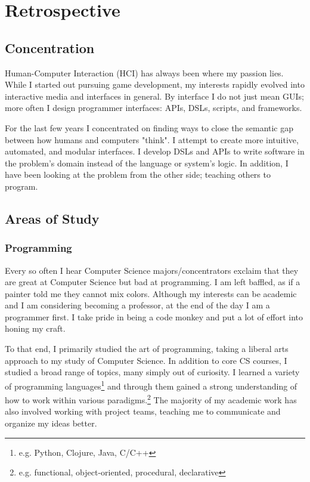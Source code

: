 \chapter{Retrospective}

\section*{Concentration}


Human-Computer Interaction (HCI) has always been where my passion lies.
While I started out pursuing game development, my interests rapidly
evolved into interactive media and interfaces in general. By interface I
do not just mean GUIs; more often I design programmer interfaces: APIs,
DSLs, scripts, and frameworks.

For the last few years I concentrated on finding ways to close the
semantic gap between how humans and computers "think". I attempt
to create more intuitive, automated, and modular interfaces. I develop
DSLs and APIs to write software in the problem's domain instead of the
language or system's logic. In addition, I have been looking at the
problem from the other side; teaching others to program.


\section*{Areas of Study}
\subsection*{Programming}

Every so often I hear Computer Science majors/concentrators exclaim that
they are great at Computer Science but bad at programming. I am left
baffled, as if a painter told me they cannot mix colors. Although my
interests can be academic and I am considering becoming a professor, at
the end of the day I am a programmer first. I take pride in being a code
monkey and put a lot of effort into honing my craft.

To that end, I primarily studied the art of programming, taking a
liberal arts approach to my study of Computer Science. In addition
to core CS courses, I studied a broad range of topics, many simply
out of curiosity. I learned a variety of programming languages\footnote{e.g.
Python, Clojure, Java, C/C++} and through them gained a strong
understanding of how to work within various paradigms.\footnote{e.g. functional,
object-oriented, procedural, declarative} The majority of my academic work has also
involved working with project teams, teaching me to communicate and
organize my ideas better.

